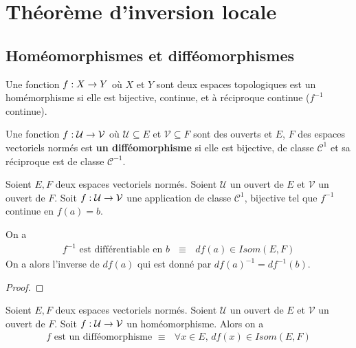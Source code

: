 \chapter{Théorème d'inversion locale}

\section{Homéomorphismes et difféomorphismes}

\begin{definition}
	\label{definition:homeomorphisme}
	Une fonction $f : X \rightarrow Y$ où $X$ et $Y$ sont deux espaces
	topologiques est un homémorphisme si elle est bijective, continue, et à
	réciproque continue ($f^{-1}$ continue).
\end{definition}

\begin{definition}
\label{definition:diffeomorphism}
	Une fonction $f : \mathcal{U} \rightarrow \mathcal{V}$ où $\mathcal{U}
	\subseteq E$ et $\mathcal{V} \subseteq F$ sont des ouverts et $E$, $F$ des espaces
	vectoriels normés est \textbf{un difféomorphisme} si elle est bijective,
	de classe $\mathcal{C}^{1}$ et sa réciproque est de classe
	$\mathcal{C}^{-1}$.
\end{definition}

\begin{proposition}
	Soient $E, F$ deux espaces vectoriels normés.
	Soient $\mathcal{U}$ un ouvert de $E$ et $\mathcal{V}$ un ouvert de $F$.
	Soit $f : \mathcal{U} \rightarrow \mathcal{V}$ une application de classe
	$\mathcal{C}^{1}$, bijective tel que $f^{-1}$ continue en $f(a) = b$.

	On a
	\begin{align*}
		\text{$f^{-1}$ est différentiable en $b$ $\equiv$ $df(a) \in Isom(E, F)$}
	\end{align*}
	On a alors l'inverse de $df(a)$ qui est donné par ${df(a)}^{-1} =
	df^{-1}(b)$.
\end{proposition}

\ifdefined\outputproof
\begin{proof}

\end{proof}
\fi

\begin{proposition}
	\label{prop:homeo_diffeo_ssi_dfx_isom}
	Soient $E, F$ deux espaces vectoriels normés.
	Soient $\mathcal{U}$ un ouvert de $E$ et $\mathcal{V}$ un ouvert de $F$.
	Soit $f : \mathcal{U} \rightarrow \mathcal{V}$ un homéomorphisme. Alors on a
	\begin{align*}
		\text{$f$ est un difféomorphisme $\equiv$ $\forall x \in E$, $df(x) \in
		Isom(E, F)$}
	\end{align*}
\end{proposition}

